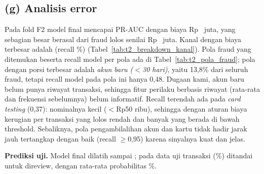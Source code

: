 \subsection*{(g) Analisis error}
Pada fold F2 model final mencapai PR-AUC \TduaFinalValPR{} dengan biaya Rp~\TduaFinalValBiaya{} juta, yang sebagian besar berasal dari fraud lolos
senilai Rp~\TduaNominalFN{} juta. Kanal dengan biaya terbesar adalah \textbf{\TduaKanalBiayaTerbesar} (recall \TduaKanalRecall\%)
(Tabel~\ref{tab:t2_breakdown_kanal}). Pola fraud yang ditemukan beserta recall model per pola ada di Tabel~\ref{tab:t2_pola_fraud};
pola dengan porsi terbesar adalah \emph{akun baru ($<$30 hari)}, yaitu 13{,}8\% dari seluruh fraud, tetapi recall model pada pola ini hanya 0{,}48. Dugaan kami, akun baru belum punya riwayat transaksi, sehingga fitur perilaku berbasis riwayat (rata-rata dan frekuensi sebelumnya) belum informatif. Recall terendah ada pada \emph{card testing} (0{,}37): nominalnya kecil ($<$Rp50 ribu), sehingga dengan aturan biaya kerugian per transaksi yang lolos rendah dan banyak yang berada di bawah threshold. Sebaliknya, pola pengambilalihan akun dan kartu tidak hadir jarak jauh tertangkap dengan baik (recall $\geq$0{,}95) karena sinyalnya kuat dan jelas.



\textbf{Prediksi uji.} Model final dilatih sampai \TduaBatasLatih; pada data uji \TduaTestDitandai{} transaksi (\TduaTestPersenDitandai\%) ditandai
untuk direview, dengan rata-rata probabilitas \TduaTestProbRata\%.
